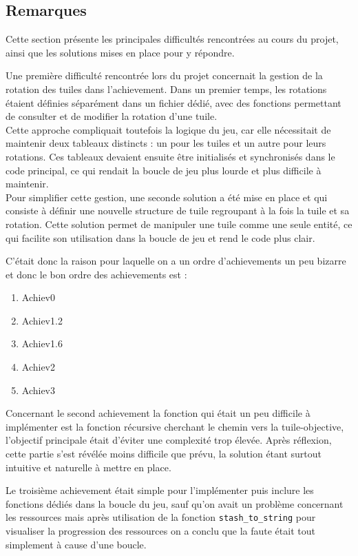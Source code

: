 
\subsection*{Remarques}

Cette section présente les principales difficultés rencontrées au cours du projet, ainsi que les solutions mises en place pour y répondre.

Une première difficulté rencontrée lors du projet concernait la gestion de la rotation des tuiles dans l'achievement. Dans un premier temps, les rotations étaient définies séparément dans un fichier dédié, avec des fonctions permettant de consulter et de modifier la rotation d’une tuile.\\
Cette approche compliquait toutefois la logique du jeu, car elle nécessitait de maintenir deux tableaux distincts : un pour les tuiles et un autre pour leurs rotations. Ces tableaux devaient ensuite être initialisés et synchronisés dans le code principal, ce qui rendait la boucle de jeu plus lourde et plus difficile à maintenir.\\
Pour simplifier cette gestion, une seconde solution a été mise en place et qui consiste à définir une nouvelle structure de tuile regroupant à la fois la tuile et sa rotation. Cette solution permet de manipuler une tuile comme une seule entité, ce qui facilite son utilisation dans la boucle de jeu et rend le code plus clair.

C'était donc la raison pour laquelle on a un ordre d'achievements un peu bizarre et donc le bon ordre des achievements est :
\begin{enumerate}
    \item Achiev0
    \item Achiev1.2
    \item Achiev1.6
    \item Achiev2
    \item Achiev3
\end{enumerate}

Concernant le second achievement la fonction qui était un peu difficile à implémenter est la fonction récursive cherchant le chemin vers la tuile-objective, l’objectif principale était d’éviter une complexité trop élevée. Après réflexion, cette partie s’est révélée moins difficile que prévu, la solution étant surtout intuitive et naturelle à mettre en place.

Le troisième achievement était simple pour l'implémenter puis inclure les fonctions dédiés dans la boucle du jeu, sauf qu'on avait un problème concernant les ressources mais après utilisation de la fonction \texttt{stash\_to\_string} pour visualiser la progression des ressources on a conclu que la faute était tout simplement à cause d'une boucle.


